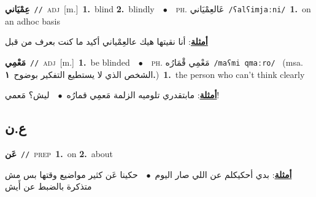 \documentclass[10pt,a4paper,twoside]{article} %
\begin{document}
\begin{multicols}{2}
{\setlength\topsep{0pt}\textbf{\foreignlanguage{arabic}{عِمْيَاني}}\ {\color{gray}\texttt{//}\color{black}}\ \textsc{adj}\ [m.]\ \textbf{1.}~blind  \textbf{2.}~blindly\ \ $\bullet$\ \ \textsc{ph.} \color{gray} \foreignlanguage{arabic}{عَالعِمْيَاني}\color{black}\ {\color{gray}\texttt{/{\sffamily ʕalʕimjaːni}/}\color{black}}\ \textbf{1.}~on an adhoc basis\  \begin{flushright}\color{gray}\foreignlanguage{arabic}{\textbf{\underline{\foreignlanguage{arabic}{أمثلة}}}: أنا نقيتها هيك عالعِمْياني أكيد ما كنت بعرف من قبل}\end{flushright}\color{black}} \vspace{2mm}

{\setlength\topsep{0pt}\textbf{\foreignlanguage{arabic}{مَعْمِي}}\ {\color{gray}\texttt{//}\color{black}}\ \textsc{adj}\ [m.]\ \textbf{1.}~be blinded\ \ $\bullet$\ \ \textsc{ph.} \color{gray} \foreignlanguage{arabic}{مَعْمِي قْمَارُه}\color{black}\ {\color{gray}\texttt{/{\sffamily maʕmi qmaːro}/}\color{black}}\ \color{gray} (msa. \foreignlanguage{arabic}{الشخص الذي لا يستطيع التفكير بوضوح}~\foreignlanguage{arabic}{\textbf{١.}})\color{black}\ \textbf{1.}~the person who can't think clearly\  \begin{flushright}\color{gray}\foreignlanguage{arabic}{\textbf{\underline{\foreignlanguage{arabic}{أمثلة}}}: مابتقدري تلوميه الزلمة مَعمِي قمارُه\ $\bullet$\ \  ليش؟ مَعمي!}\end{flushright}\color{black}} \vspace{2mm}

\vspace{-3mm}
\subsection*{\color{blue}\foreignlanguage{arabic}{ع.ن}\color{blue}{ (ntws)}} 

{\setlength\topsep{0pt}\textbf{\foreignlanguage{arabic}{عَن}}\ {\color{gray}\texttt{//}\color{black}}\ \textsc{prep}\ \textbf{1.}~on  \textbf{2.}~about\  \begin{flushright}\color{gray}\foreignlanguage{arabic}{\textbf{\underline{\foreignlanguage{arabic}{أمثلة}}}: بدي أحكيكلم عن اللي صار اليوم\ $\bullet$\ \  حكينا عَن كثير مواضيع وقتها بس مش متذكرة بالضبط عن أَيش}\end{flushright}\color{black}} \vspace{2mm}


\end{multicols}
\end{document}
